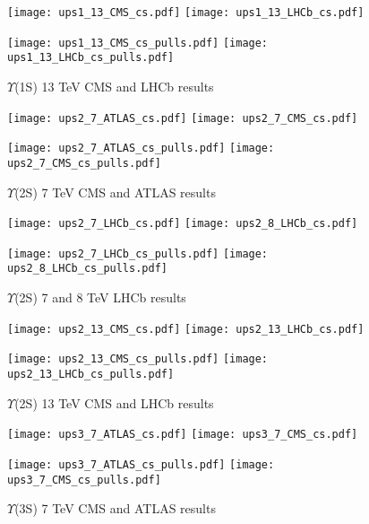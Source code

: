 \documentclass{article}
\begin{document}
\clearpage

\begin{figure}
\centering
\texttt{[image: ups1\_13\_CMS\_cs.pdf]}
\texttt{[image: ups1\_13\_LHCb\_cs.pdf]}

\texttt{[image: ups1\_13\_CMS\_cs\_pulls.pdf]}
\texttt{[image: ups1\_13\_LHCb\_cs\_pulls.pdf]}
\caption{$\Upsilon$(1S) 13 TeV CMS and LHCb results}
\end{figure}

\clearpage


\begin{figure}
\centering
\texttt{[image: ups2\_7\_ATLAS\_cs.pdf]}
\texttt{[image: ups2\_7\_CMS\_cs.pdf]}

\texttt{[image: ups2\_7\_ATLAS\_cs\_pulls.pdf]}
\texttt{[image: ups2\_7\_CMS\_cs\_pulls.pdf]}
\caption{$\Upsilon$(2S) 7 TeV CMS and ATLAS results}
\end{figure}

\clearpage

\begin{figure}
\centering
\texttt{[image: ups2\_7\_LHCb\_cs.pdf]}
\texttt{[image: ups2\_8\_LHCb\_cs.pdf]}

\texttt{[image: ups2\_7\_LHCb\_cs\_pulls.pdf]}
\texttt{[image: ups2\_8\_LHCb\_cs\_pulls.pdf]}
\caption{$\Upsilon$(2S) 7 and 8 TeV LHCb results}
\end{figure}

\clearpage

\begin{figure}
\centering
\texttt{[image: ups2\_13\_CMS\_cs.pdf]}
\texttt{[image: ups2\_13\_LHCb\_cs.pdf]}

\texttt{[image: ups2\_13\_CMS\_cs\_pulls.pdf]}
\texttt{[image: ups2\_13\_LHCb\_cs\_pulls.pdf]}
\caption{$\Upsilon$(2S) 13 TeV CMS and LHCb results}
\end{figure}

\clearpage

\begin{figure}
\centering
\texttt{[image: ups3\_7\_ATLAS\_cs.pdf]}
\texttt{[image: ups3\_7\_CMS\_cs.pdf]}

\texttt{[image: ups3\_7\_ATLAS\_cs\_pulls.pdf]}
\texttt{[image: ups3\_7\_CMS\_cs\_pulls.pdf]}
\caption{$\Upsilon$(3S) 7 TeV CMS and ATLAS results}
\end{figure}
\end{document}
